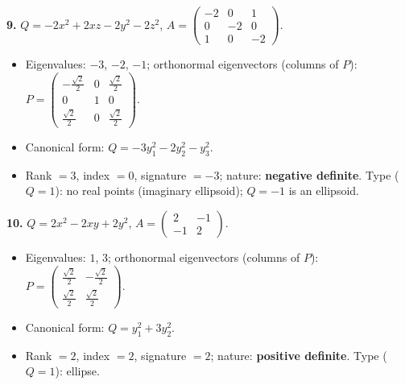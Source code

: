 \noindent\textbf{9.} $Q=- 2 x^{2} + 2 x z - 2 y^{2} - 2 z^{2}$, $A=\begin{pmatrix}-2 & 0 & 1 \\ 0 & -2 & 0 \\ 1 & 0 & -2\end{pmatrix}$.
\begin{itemize}\item Eigenvalues: $-3$, $-2$, $-1$; orthonormal eigenvectors (columns of $P$): $P=\begin{pmatrix}- \frac{\sqrt{2}}{2} & 0 & \frac{\sqrt{2}}{2} \\ 0 & 1 & 0 \\ \frac{\sqrt{2}}{2} & 0 & \frac{\sqrt{2}}{2}\end{pmatrix}$.
\item Canonical form: $Q=- 3 y_{1}^{2} - 2 y_{2}^{2} - y_{3}^{2}$.
\item Rank $=3$, index $=0$, signature $=-3$; nature: \textbf{negative definite}. Type ($Q=1$): no real points (imaginary ellipsoid); $Q=-1$ is an ellipsoid.\end{itemize}

\noindent\textbf{10.} $Q=2 x^{2} - 2 x y + 2 y^{2}$, $A=\begin{pmatrix}2 & -1 \\ -1 & 2\end{pmatrix}$.
\begin{itemize}\item Eigenvalues: $1$, $3$; orthonormal eigenvectors (columns of $P$): $P=\begin{pmatrix}\frac{\sqrt{2}}{2} & - \frac{\sqrt{2}}{2} \\ \frac{\sqrt{2}}{2} & \frac{\sqrt{2}}{2}\end{pmatrix}$.
\item Canonical form: $Q=y_{1}^{2} + 3 y_{2}^{2}$.
\item Rank $=2$, index $=2$, signature $=2$; nature: \textbf{positive definite}. Type ($Q=1$): ellipse.\end{itemize}
